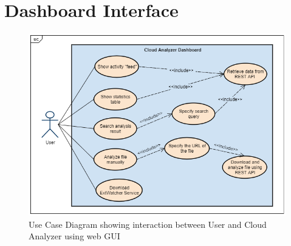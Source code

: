 

\section{Dashboard Interface}
\label{section:dashboard}

\begin{figure}[H]
	\centerline{\includegraphics[scale=0.7]{figures/usecaseGUI.png}}  
	\caption{Use Case Diagram showing interaction between User and Cloud Analyzer using web GUI}
	\label{usecase}
\end{figure}